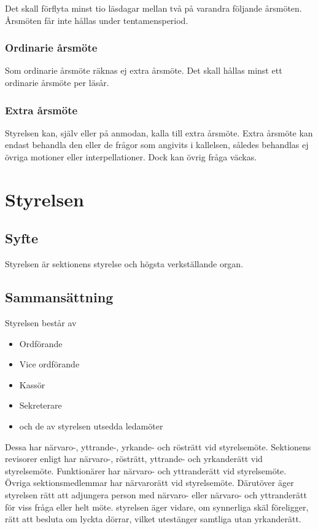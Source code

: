 \documentclass{../resources/dgovdoc}
\begin{document}
Det skall förflyta minst tio läsdagar mellan två på varandra följande årsmöten. Årsmöten
får inte hållas under tentamensperiod.

\subsubsection{Ordinarie årsmöte}
\label{sec:ordinarie_sm}

Som ordinarie årsmöte räknas ej extra årsmöte. Det
skall hållas minst ett ordinarie årsmöte per läsår.

\subsubsection{Extra årsmöte}

Styrelsen kan, själv eller på anmodan, kalla till extra årsmöte. Extra årsmöte kan
endast behandla den eller de frågor som angivits i kallelsen, således behandlas
ej övriga motioner eller interpellationer. Dock kan övrig fråga
väckas.

\section{Styrelsen}

\subsection{Syfte}

Styrelsen är sektionens styrelse och högsta verkställande organ.

\subsection{Sammansättning}

Styrelsen består av

\begin{itemize}
  \item Ordförande
  \item Vice ordförande
  \item Kassör
  \item Sekreterare
  \item och de av styrelsen utsedda ledamöter
\end{itemize}

Dessa har närvaro-, yttrande-, yrkande- och rösträtt vid styrelsemöte. Sektionens
revisorer enligt har närvaro-, rösträtt, yttrande- och yrkanderätt vid styrelsemöte. 
Funktionärer har närvaro- och yttranderätt vid styrelsemöte. Övriga sektionsmedlemmar har närvarorätt
vid styrelsemöte. Därutöver äger styrelsen rätt att adjungera person med närvaro-
eller närvaro- och yttranderätt för viss fråga eller helt möte. styrelsen
äger vidare, om synnerliga skäl föreligger, rätt att besluta om lyckta dörrar,
vilket utestänger samtliga utan yrkanderätt.
\end{document}
